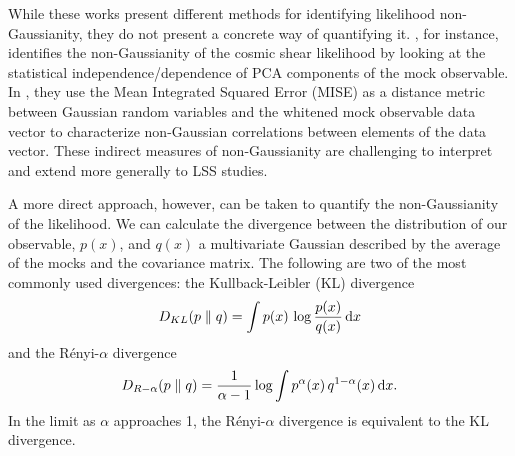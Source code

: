 \documentclass[12pt, letterpaper, preprint]{aastex}
\newcommand{\beq}{\begin{equation}}
\newcommand{\eeq}{\end{equation}}
\begin{document}
While these works present different methods for identifying 
likelihood non-Gaussianity, they do not present a concrete way of 
quantifying it. \cite{hartlap2009}, for instance, identifies the
non-Gaussianity of the cosmic shear likelihood by looking at the
statistical independence/dependence of PCA components of the mock 
observable. In \cite{sellentin2017}, they use the Mean
Integrated Squared Error (MISE) as a distance metric between 
Gaussian random variables and the whitened mock observable 
data vector to characterize non-Gaussian correlations between elements 
of the data vector. These indirect measures of non-Gaussianity 
are challenging to interpret and extend more generally to LSS studies. 

A more direct approach, however, can be taken to quantify the 
non-Gaussianity of the likelihood. We can calculate the divergence between 
the distribution of our observable, $p(x)$, and $q(x)$ a multivariate Gaussian described 
by the average of the mocks and the covariance matrix.
The following are two of the most commonly used divergences: 
the Kullback-Leibler (KL) divergence
\beq \label{eq:kl} 
D_{KL} ( p \parallel q ) = \int p(x)\,\log \frac{p(x)}{q(x)}\,{\rm d}x
\eeq
and the R\'enyi-$\alpha$ divergence
\beq \label{eq:renyi}
D_{R-\alpha} ( p \parallel q ) = \frac{1}{\alpha -1} \log \int p^\alpha(x)\, q^{1 -\alpha}(x)\,{\rm d}x. 
\eeq
In the limit as $\alpha$ approaches 1, the R\'enyi-$\alpha$ divergence is
equivalent to the KL divergence.
\end{document}

